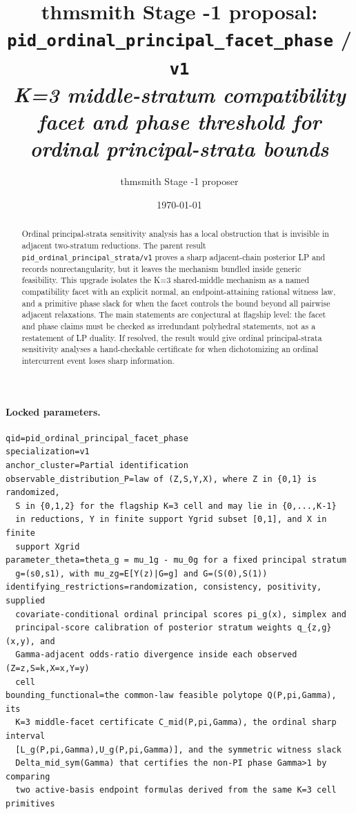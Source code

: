 \documentclass[11pt]{article}
\title{thmsmith Stage -1 proposal: \texttt{pid\_ordinal\_principal\_facet\_phase} / \texttt{v1}%
  \\ \large\textit{K=3 middle-stratum compatibility facet and phase threshold for ordinal principal-strata bounds}}
\author{thmsmith Stage -1 proposer}
\date{\today}
\theoremstyle{definition}
\theoremstyle{plain}
\theoremstyle{remark}
\begin{document}
\maketitle


\paragraph{Locked parameters.}
\begin{verbatim}
qid=pid_ordinal_principal_facet_phase
specialization=v1
anchor_cluster=Partial identification
observable_distribution_P=law of (Z,S,Y,X), where Z in {0,1} is randomized,
  S in {0,1,2} for the flagship K=3 cell and may lie in {0,...,K-1}
  in reductions, Y in finite support Ygrid subset [0,1], and X in finite
  support Xgrid
parameter_theta=theta_g = mu_1g - mu_0g for a fixed principal stratum
  g=(s0,s1), with mu_zg=E[Y(z)|G=g] and G=(S(0),S(1))
identifying_restrictions=randomization, consistency, positivity, supplied
  covariate-conditional ordinal principal scores pi_g(x), simplex and
  principal-score calibration of posterior stratum weights q_{z,g}(x,y), and
  Gamma-adjacent odds-ratio divergence inside each observed (Z=z,S=k,X=x,Y=y)
  cell
bounding_functional=the common-law feasible polytope Q(P,pi,Gamma), its
  K=3 middle-facet certificate C_mid(P,pi,Gamma), the ordinal sharp interval
  [L_g(P,pi,Gamma),U_g(P,pi,Gamma)], and the symmetric witness slack
  Delta_mid_sym(Gamma) that certifies the non-PI phase Gamma>1 by comparing
  two active-basis endpoint formulas derived from the same K=3 cell primitives
\end{verbatim}

\begin{abstract}
Ordinal principal-strata sensitivity analysis has a local obstruction that is invisible in adjacent two-stratum reductions.
The parent result \texttt{pid\_ordinal\_principal\_strata/v1} proves a sharp adjacent-chain posterior LP and records nonrectangularity, but it leaves the mechanism bundled inside generic feasibility.
This upgrade isolates the K=3 shared-middle mechanism as a named compatibility facet with an explicit normal, an endpoint-attaining rational witness law, and a primitive phase slack for when the facet controls the bound beyond all pairwise adjacent relaxations.
The main statements are conjectural at flagship level: the facet and phase claims must be checked as irredundant polyhedral statements, not as a restatement of LP duality.
If resolved, the result would give ordinal principal-strata sensitivity analyses a hand-checkable certificate for when dichotomizing an ordinal intercurrent event loses sharp information.
\end{abstract}
\end{document}

